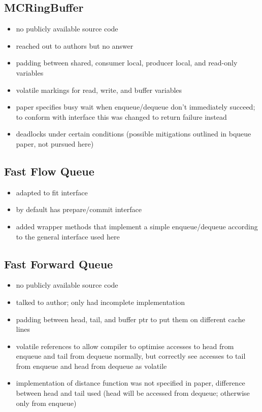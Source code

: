 \subsection{MCRingBuffer}
\begin{itemize}
    \item no publicly available source code
    \item reached out to authors but no answer
    \item padding between shared, consumer local, producer local, and read-only variables
    \item volatile markings for read, write, and buffer variables
    \item paper specifies busy wait when enqueue/dequeue don't immediately succeed; to conform with interface
        this was changed to return failure instead
    \item deadlocks under certain conditions (possible mitigations outlined in bqueue paper, not pursued here)
\end{itemize}

\subsection{Fast Flow Queue}
\begin{itemize}
    \item adapted to fit interface
    \item by default has prepare/commit interface
    \item added wrapper methods that implement a simple enqueue/dequeue according to the general interface used here
\end{itemize}

\subsection{Fast Forward Queue}
\begin{itemize}
    \item no publicly available source code
    \item talked to author; only had incomplete implementation
    \item padding between head, tail, and buffer ptr to put them on different cache lines
    \item volatile references to allow compiler to optimise accesses to head from enqueue and tail from
        dequeue normally, but correctly see accesses to tail from enqueue and head from dequeue as volatile
    \item implementation of distance function was not specified in paper, difference between head and tail
        used (head will be accessed from dequeue; otherwise only from enqueue)
\end{itemize}

